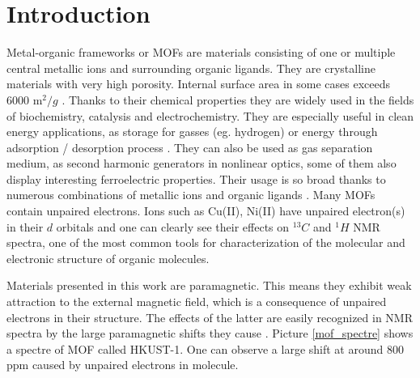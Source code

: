 \documentclass[openany, longbibliography,slovene,a4paper,12pt]{article}
\begin{document}
%


\section{Introduction}

Metal-organic frameworks or MOFs are materials consisting of one or multiple
central metallic ions and surrounding organic ligands.  They are crystalline
materials with very high porosity. Internal surface area in some cases exceeds
6000 $\mathrm{m}^2/{g}$ \cite{introd_to_metal_organ_frameworks}. Thanks to their
chemical properties they are widely used in the fields of biochemistry,
catalysis and electrochemistry. They are especially useful in clean energy
applications, as storage for gasses (eg. hydrogen) or energy through
adsorption / desorption process \cite{introd_to_metal_organ_frameworks}. They can
also be used as gas separation medium, as second harmonic generators in
nonlinear optics, some of them also display interesting ferroelectric
properties. Their usage is so broad thanks to numerous combinations of metallic
ions and organic ligands  \cite{introd_to_metal_organ_frameworks,
  Assignment_of_Solid_State}. Many MOFs contain unpaired electrons. Ions such as Cu(II), Ni(II) have unpaired electron(s) in their $d$ orbitals and one can clearly see their
 effects on $^{13}C$ and $^{1}H$ NMR  spectra, one of the most common tools for
 characterization of the molecular and electronic structure of organic
 molecules.

 Materials presented in this work are paramagnetic. This means they exhibit weak
 attraction to the external magnetic field, which is a consequence of unpaired
 electrons in their structure. The effects of the latter are easily recognized
 in NMR spectra by the large paramagnetic shifts they cause
 \cite{Dft_Investigation_of_the_Effect_of_Spin_Orbit}. Picture \ref{mof_spectre}
 shows a spectre of MOF called HKUST-1. One can observe a large shift at around
 800 ppm caused by unpaired electrons in molecule.
\end{document}
